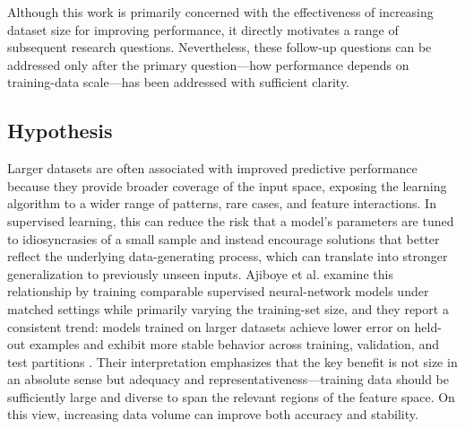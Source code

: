 \documentclass[12pt,a4paper]{article}
\begin{document}
Although this work is primarily concerned with the effectiveness of increasing dataset size for improving performance, it directly motivates a range of subsequent research questions. Nevertheless, these follow-up questions can be addressed only after the primary question—how performance depends on training-data scale—has been addressed with sufficient clarity.

\subsection{Hypothesis}
Larger datasets are often associated with improved predictive performance because they provide broader coverage of the input space, exposing the learning algorithm to a wider range of patterns, rare cases, and feature interactions. In supervised learning, this can reduce the risk that a model’s parameters are tuned to idiosyncrasies of a small sample and instead encourage solutions that better reflect the underlying data-generating process, which can translate into stronger generalization to previously unseen inputs. Ajiboye et al. examine this relationship by training comparable supervised neural-network models under matched settings while primarily varying the training-set size, and they report a consistent trend: models trained on larger datasets achieve lower error on held-out examples and exhibit more stable behavior across training, validation, and test partitions \cite{ajiboye2015}. Their interpretation emphasizes that the key benefit is not size in an absolute sense but adequacy and representativeness—training data should be sufficiently large and diverse to span the relevant regions of the feature space. On this view, increasing data volume can improve both accuracy and stability.
\end{document}
